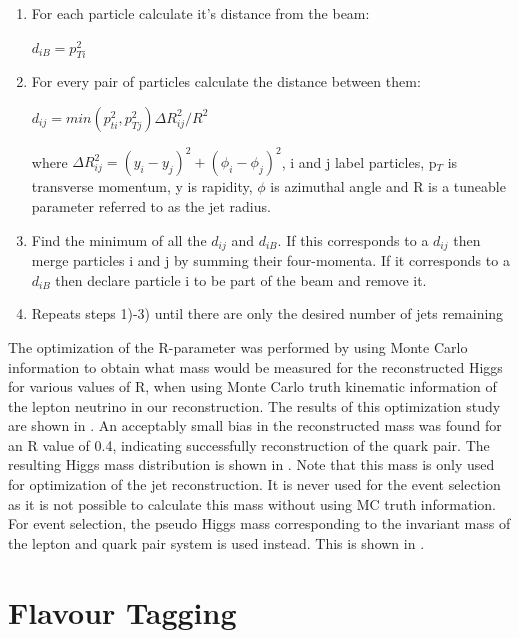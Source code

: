 \begin{enumerate}
\item For each particle calculate it's distance from the beam:
\begin{center}
  $d_{iB} = p_{Ti}^2$
\end{center}
\item For every pair of particles calculate the distance between them:
\begin{center}
  $d_{ij}=min(p_{ti}^2,p_{Tj}^2)\Delta R_{ij}^2/R^2$
\end{center}
where $\Delta R_{ij}^2=(y_i-y_j)^2 + (\phi_i-\phi_j)^2$, i and j label particles, p$_T$ is transverse momentum, y is rapidity, $\phi$ is azimuthal angle and R is a tuneable parameter referred to as the jet radius.
\item Find the minimum of all the $d_{ij}$ and $d_{iB}$. If this corresponds to a $d_{ij}$ then merge particles i and j by summing their four-momenta. If it corresponds to a $d_{iB}$ then declare particle i to be part of the beam and remove it.
\item Repeats steps 1)-3) until there are only the desired number of jets remaining
\end{enumerate}

The optimization of the R-parameter was performed by using Monte Carlo information to obtain what mass would be measured for the reconstructed Higgs for various values of R, when using Monte Carlo truth kinematic information of the lepton neutrino in our reconstruction. The results of this optimization study are shown in . An acceptably small bias in the reconstructed mass was found for an R value of 0.4, indicating successfully reconstruction of the quark pair. The resulting Higgs mass distribution is shown in . Note that this mass is only used for optimization of the jet reconstruction. It is never used for the event selection as it is not possible to calculate this mass without using MC truth information. For event selection, the pseudo Higgs mass corresponding to the invariant mass of the lepton and quark pair system is used instead. This is shown in .



\section{Flavour Tagging}

